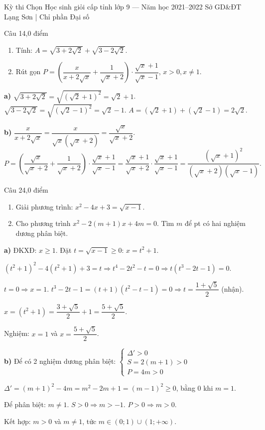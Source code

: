 ﻿%
%
  {Kỳ thi Chọn Học sinh giỏi cấp tỉnh lớp 9 — Năm học 2021--2022}%
  {Sở GD\&ĐT Lạng Sơn | Chỉ phần Đại số}

\begin{de_cau}{Câu 1}{4,0 điểm}
\begin{enumerate}[label=\alph*)]
\item Tính: $A=\sqrt{3+2\sqrt{2}}+\sqrt{3-2\sqrt{2}}$.
\item Rút gọn $P=\left(\dfrac{x}{x+2\sqrt{x}}+\dfrac{1}{\sqrt{x}+2}\right)\cdot\dfrac{\sqrt{x}+1}{\sqrt{x}-1}$,
$x>0, x\neq 1$.
\end{enumerate}
\end{de_cau}

\begin{loi_giai_cau}
\textbf{a)} $\sqrt{3+2\sqrt{2}}=\sqrt{(\sqrt{2}+1)^2}=\sqrt{2}+1$.
$\sqrt{3-2\sqrt{2}}=\sqrt{(\sqrt{2}-1)^2}=\sqrt{2}-1$.
$A=(\sqrt{2}+1)+(\sqrt{2}-1)=2\sqrt{2}$.

\textbf{b)} $\dfrac{x}{x+2\sqrt{x}}=\dfrac{x}{\sqrt{x}(\sqrt{x}+2)}=\dfrac{\sqrt{x}}{\sqrt{x}+2}$.
\[P=\left(\frac{\sqrt{x}}{\sqrt{x}+2}+\frac{1}{\sqrt{x}+2}\right)\cdot\frac{\sqrt{x}+1}{\sqrt{x}-1}
=\frac{\sqrt{x}+1}{\sqrt{x}+2}\cdot\frac{\sqrt{x}+1}{\sqrt{x}-1}=\frac{(\sqrt{x}+1)^2}{(\sqrt{x}+2)(\sqrt{x}-1)}.\]
\end{loi_giai_cau}

\begin{de_cau}{Câu 2}{4,0 điểm}
\begin{enumerate}[label=\alph*)]
\item Giải phương trình: $x^2 - 4x + 3 = \sqrt{x-1}$.
\item Cho phương trình $x^2-2(m+1)x+4m=0$. Tìm $m$ để pt có hai nghiệm dương phân biệt.
\end{enumerate}
\end{de_cau}

\begin{loi_giai_cau}
\textbf{a)} ĐKXĐ: $x\geq 1$. Đặt $t=\sqrt{x-1}\geq 0$: $x=t^2+1$.

$(t^2+1)^2-4(t^2+1)+3=t\Rightarrow t^4-2t^2-t=0\Rightarrow t(t^3-2t-1)=0$.

$t=0\Rightarrow x=1$. $t^3-2t-1=(t+1)(t^2-t-1)=0\Rightarrow t=\dfrac{1+\sqrt{5}}{2}$ (nhận).

$x=(t^2+1)=\dfrac{3+\sqrt{5}}{2}+1=\dfrac{5+\sqrt{5}}{2}$.

Nghiệm: $x=1$ và $x=\dfrac{5+\sqrt{5}}{2}$.

\textbf{b)} Để có 2 nghiệm dương phân biệt:
$\begin{cases}\Delta'>0\\S=2(m+1)>0\\P=4m>0\end{cases}$

$\Delta'=(m+1)^2-4m=m^2-2m+1=(m-1)^2\geq 0$, bằng $0$ khi $m=1$.

Để phân biệt: $m\neq 1$. $S>0\Rightarrow m>-1$. $P>0\Rightarrow m>0$.

Kết hợp: $m>0$ và $m\neq 1$, tức $m\in(0;1)\cup(1;+\infty)$.
\end{loi_giai_cau}

